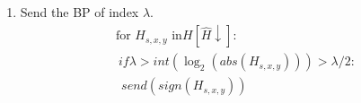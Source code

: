 \begin{enumerate}
\begin{enumerate}
  \item Send the BP of index $\lambda$.
    \begin{equation}
      \begin{array}{l}
        \text{for~}H_{s,x,y}\text{~in} H[\hat{H}\downarrow]: \\
        ~ if \lambda > int(\log_2(abs(H_{s,x,y}))) > \lambda/2: \\
        ~~ send(sign(H_{s,x,y}))\\
        ~ 
      \end{array}
    \end{equation}
  \end{enumerate}
\end{enumerate}
  
